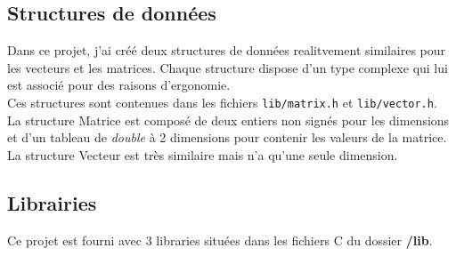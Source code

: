 \documentclass[11pt, a4paper]{article}
\begin{document}
\subsection{Structures de données}

Dans ce projet, j'ai créé deux structures de données realitvement similaires pour les vecteurs et les matrices. Chaque structure dispose d'un type complexe qui lui est associé pour des raisons d'ergonomie.\\

Ces structures sont contenues dans les fichiers \texttt{lib/matrix.h} et \texttt{lib/vector.h}.\\

La structure Matrice est composé de deux entiers non signés pour les dimensions et d'un tableau de \textit{double} à 2 dimensions pour contenir les valeurs de la matrice.\\

La structure Vecteur est très similaire mais n'a qu'une seule dimension.\\

\subsection{Librairies}

Ce projet est fourni avec 3 libraries situées dans les fichiers C du dossier \textbf{/lib}.
\end{document}
